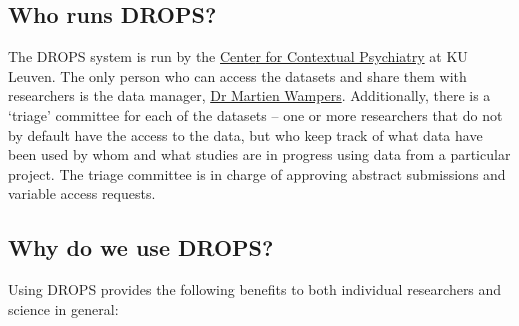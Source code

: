 \documentclass[
]{article}
\begin{document}
\hypertarget{who-runs-drops}{%
\subsection{Who runs DROPS?}\label{who-runs-drops}}

The DROPS system is run by the
\href{https://gbiomed.kuleuven.be/english/research/50000666/50000673/cpp}{Cente}\href{https://gbiomed.kuleuven.be/english/research/50000666/50000673/cpp}{r
for Contextual Psychiatry} at KU Leuven. The only person who can access
the datasets and share them with researchers is the data manager,
\href{https://www.kuleuven.be/wieiswie/en/person/00007576}{Dr Martien
Wampers}. Additionally, there is a `triage' committee for each of the
datasets --⁠ one or more researchers that do not by default have the
access to the data, but who keep track of what data have been used by
whom and what studies are in progress using data from a particular
project. The triage committee is in charge of approving abstract
submissions and variable access requests.

\hypertarget{why-do-we-use-drops}{%
\subsection{Why do we use DROPS?}\label{why-do-we-use-drops}}

Using DROPS provides the following benefits to both individual
researchers and science in general:
\end{document}
